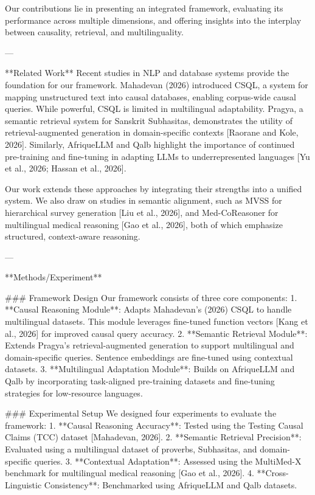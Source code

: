 Our contributions lie in presenting an integrated framework, evaluating its performance across multiple dimensions, and offering insights into the interplay between causality, retrieval, and multilinguality.  

---

**Related Work**  
Recent studies in NLP and database systems provide the foundation for our framework. Mahadevan (2026) introduced CSQL, a system for mapping unstructured text into causal databases, enabling corpus-wide causal queries. While powerful, CSQL is limited in multilingual adaptability. Pragya, a semantic retrieval system for Sanskrit Subhasitas, demonstrates the utility of retrieval-augmented generation in domain-specific contexts [Raorane and Kole, 2026]. Similarly, AfriqueLLM and Qalb highlight the importance of continued pre-training and fine-tuning in adapting LLMs to underrepresented languages [Yu et al., 2026; Hassan et al., 2026].  

Our work extends these approaches by integrating their strengths into a unified system. We also draw on studies in semantic alignment, such as MVSS for hierarchical survey generation [Liu et al., 2026], and Med-CoReasoner for multilingual medical reasoning [Gao et al., 2026], both of which emphasize structured, context-aware reasoning.  

---

**Methods/Experiment**  

### Framework Design  
Our framework consists of three core components:  
1. **Causal Reasoning Module**: Adapts Mahadevan's (2026) CSQL to handle multilingual datasets. This module leverages fine-tuned function vectors [Kang et al., 2026] for improved causal query accuracy.  
2. **Semantic Retrieval Module**: Extends Pragya's retrieval-augmented generation to support multilingual and domain-specific queries. Sentence embeddings are fine-tuned using contextual datasets.  
3. **Multilingual Adaptation Module**: Builds on AfriqueLLM and Qalb by incorporating task-aligned pre-training datasets and fine-tuning strategies for low-resource languages.  

### Experimental Setup  
We designed four experiments to evaluate the framework:  
1. **Causal Reasoning Accuracy**: Tested using the Testing Causal Claims (TCC) dataset [Mahadevan, 2026].  
2. **Semantic Retrieval Precision**: Evaluated using a multilingual dataset of proverbs, Subhasitas, and domain-specific queries.  
3. **Contextual Adaptation**: Assessed using the MultiMed-X benchmark for multilingual medical reasoning [Gao et al., 2026].  
4. **Cross-Linguistic Consistency**: Benchmarked using AfriqueLLM and Qalb datasets.  

